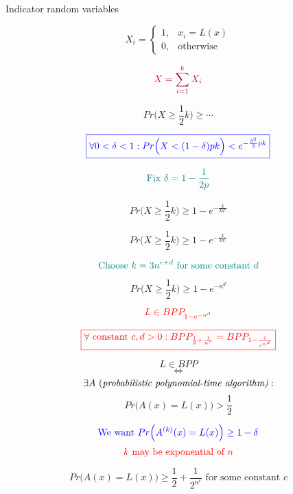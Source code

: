 \begin{frame}
  \centerline{Indicator random variables} 
  \[
	X_i = \begin{cases}
	  1, & x_i = L(x) \\
	  0, & \text{otherwise}
	\end{cases}
  \]

  \pause
  \[
	\textcolor{purple}{X = \sum_{i=1}^{k} X_i}
  \]

  \pause
  \[
	Pr\Big(X \ge \frac{1}{2} k \Big) \ge \cdots
  \]

  \pause
  \[
	\textcolor{blue}{\boxed{\forall 0 < \delta < 1: Pr\Big(X < (1-\delta)pk\Big) < e^{-\frac{\delta^2}{3}pk}}}
  \]

  \pause
  \[
	\textcolor{teal}{\text{Fix } \delta = 1 - \frac{1}{2p}}
  \]

  \pause
  \[
	Pr\Big(X \ge \frac{1}{2} k \Big) \ge 1 - e^{-\frac{k}{3n^c}}
  \]
\end{frame}
\begin{frame}
  \[
	Pr\Big(X \ge \frac{1}{2} k \Big) \ge 1 - e^{-\frac{k}{3n^c}}
  \]

  \pause
  \[
	\textcolor{teal}{\text{Choose } k = 3n^{c+d} \text{ for some constant } d}
  \]

  \pause
  \[
	Pr\Big(X \ge \frac{1}{2} k \Big) \ge 1 - e^{-n^{d}}
  \]

  \pause
  \[
	\textcolor{red}{L \in BPP_{1 - e^{-n^d}}}
  \]

  \pause
  \[
	\textcolor{red}{\boxed{\forall \text{ constant } c, d > 0: BPP_{\frac{1}{2} + \frac{1}{n^c}} = BPP_{1-\frac{1}{e^{n^d}}}}}
  \]
\end{frame}

\begin{frame}
  \begin{definition}
	\[
	  L \in BPP
	\]
	\[
	  \iff
	\]
	\[
	  \exists A \text{ (\it probabilistic polynomial-time algorithm)}: 
	\]
	\[
	  Pr\Big(A(x) = L(x)\Big) > \frac{1}{2}
	\]
  \end{definition}

  \pause
  \[
	\textcolor{blue}{\text{We want } Pr\Big(A^{(k)}(x) = L(x)\Big) \ge 1 - \delta}
  \]
  \[
	\textcolor{red}{k \text{ may be exponential of } n}
  \]

  \pause
  \[
	Pr\Big(A(x) = L(x)\Big) \ge \frac{1}{2} + \frac{1}{2^{n^{c}}} \text{ for some constant } c
  \]
\end{frame}
